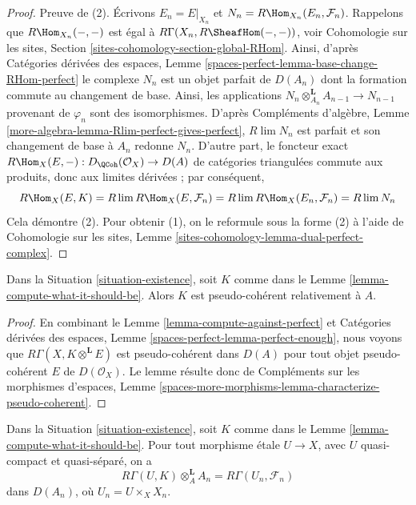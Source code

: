 \begin{proof}
Preuve de (2). Écrivons $E_n = E|_{X_n}$ et
$N_n = R\Hom_{X_n}(E_n, \mathcal{F}_n)$.
Rappelons que $R\Hom_{X_n}(-, -)$ est égal à
$R\Gamma(X_n, R\SheafHom(-, -))$, voir
Cohomologie sur les sites, Section \ref{sites-cohomology-section-global-RHom}.
Ainsi, d'après Catégories dérivées des espaces, Lemme
\ref{spaces-perfect-lemma-base-change-RHom-perfect}
le complexe $N_n$ est un objet parfait de $D(A_n)$
dont la formation commute au changement de base. Ainsi, les applications
$N_n \otimes_{A_n}^\mathbf{L} A_{n - 1} \to N_{n - 1}$
provenant de $\varphi_n$ sont des isomorphismes.
D'après Compléments d'algèbre, Lemme \ref{more-algebra-lemma-Rlim-perfect-gives-perfect},
$R\lim N_n$ est parfait et
son changement de base à $A_n$ redonne $N_n$.
D'autre part, le foncteur exact
$R\Hom_X(E, -) : D_\QCoh(\mathcal{O}_X) \to D(A)$
de catégories triangulées commute aux produits,
donc aux limites dérivées ; par conséquent,
$$
R\Hom_X(E, K) =
R\lim R\Hom_X(E, \mathcal{F}_n) =
R\lim R\Hom_X(E_n, \mathcal{F}_n) =
R\lim N_n
$$
Cela démontre (2). Pour obtenir (1), on le reformule sous la forme (2)
à l'aide de Cohomologie sur les sites, Lemme
\ref{sites-cohomology-lemma-dual-perfect-complex}.
\end{proof}

\begin{lemma}
\label{lemma-relative-pseudo-coherence}
Dans la Situation \ref{situation-existence}, soit $K$ comme dans le
Lemme \ref{lemma-compute-what-it-should-be}. Alors $K$
est pseudo-cohérent relativement à $A$.
\end{lemma}

\begin{proof}
En combinant le Lemme \ref{lemma-compute-against-perfect} et
Catégories dérivées des espaces, Lemme \ref{spaces-perfect-lemma-perfect-enough},
nous voyons que $R\Gamma(X, K \otimes^\mathbf{L} E)$
est pseudo-cohérent dans $D(A)$ pour tout objet pseudo-cohérent
$E$ de $D(\mathcal{O}_X)$. Le lemme résulte donc de
Compléments sur les morphismes d'espaces, Lemme
\ref{spaces-more-morphisms-lemma-characterize-pseudo-coherent}.
\end{proof}

\begin{lemma}
\label{lemma-compute-over-affine}
Dans la Situation \ref{situation-existence}, soit $K$ comme dans le
Lemme \ref{lemma-compute-what-it-should-be}. Pour tout
morphisme \'etale $U \to X$, avec $U$ quasi-compact et quasi-séparé, on a
$$
R\Gamma(U, K) \otimes_A^\mathbf{L} A_n =
R\Gamma(U_n, \mathcal{F}_n)
$$
dans $D(A_n)$, où $U_n = U \times_X X_n$.
\end{lemma}

